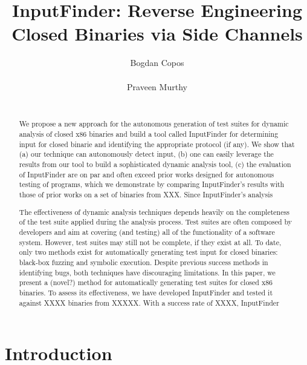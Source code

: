 \documentclass{acm_proc_article-sp}
\def \tool {InputFinder}
\begin{document}
\title{InputFinder: Reverse Engineering Closed Binaries via Side Channels}
\author{
\alignauthor
Bogdan Copos\\
	\\
\alignauthor
Praveen Murthy\\
	\\
}

\maketitle
\begin{abstract}

We propose a new approach for the autonomous generation of test suites for dynamic analysis of closed x86 binaries and build a tool called \tool{} for determining input for closed binarie and identifying the appropriate protocol (if any). 
We show that (a) our technique can autonomously detect input, (b) one can easily leverage the results from our tool to build a sophisticated dynamic analysis tool, (c) the evaluation of \tool{} are on par and often exceed prior works designed for autonomous testing of programs, which we demonstrate by comparing \tool{}'s results with those of prior works on a set of binaries from XXX.
Since \tool{}'s analysis 


The effectiveness of dynamic analysis techniques depends heavily on the completeness of the test suite applied during the analysis process.
Test suites are often composed by developers and aim at covering (and testing) all of the functionality of a software system.
However, test suites may still not be complete, if they exist at all.
To date, only two methods exist for automatically generating test input for closed binaries: black-box fuzzing and symbolic execution.
Despite previous success methods in identifying bugs, both techniques have discouraging limitations.
In this paper, we present a (novel?) method for automatically generating test suites for closed x86 binaries.
To assess its effectiveness, we have developed \tool{} and tested it against XXXX binaries from XXXXX.
With a success rate of XXXX, \tool{} 

\end{abstract}

\section{Introduction}
\end{document}

